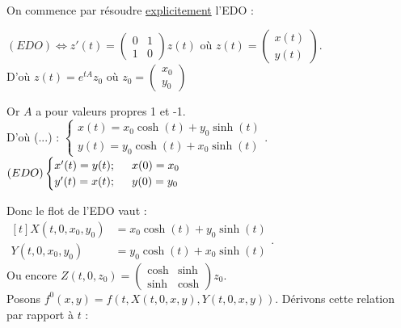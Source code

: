 \documentclass[12pt,a4paper]{article}
\begin{document}
		\begin{sol}$ $
			
			\begin{minipage}{18cm}
				On commence par résoudre \underline{explicitement} l'EDO :
				
				$(EDO) \iff z'(t) = \left(\begin{matrix}
					0 & 1\\
					1 & 0
				\end{matrix}\right)z(t)$ où $z(t) = \left(\begin{matrix}
				x(t)\\ y(t)
				\end{matrix}\right)$.\\
				
				D'où $z(t) = e^{tA}z_0$ où $z_0 = \left(\begin{matrix}
					x_0\\ y_0
				\end{matrix}\right)$
				
				Or $A$ a pour valeurs propres 1 et -1.\\
				D'où (...) : $\begin{cases}
					x(t) = x_0 \cosh(t) + y_0\sinh(t) \\
					y(t) = y_0 \cosh(t) + x_0\sinh(t)
				\end{cases}$.\\
				
				$(EDO) \begin{cases}
					x'(t) = y(t); \hspace{.5cm} x(0) = x_0\\
					y'(t) = x(t); \hspace{.5cm} y(0) = y_0
				\end{cases}$
			\end{minipage}
			\begin{minipage}{18.5cm}
				Donc le flot de l'EDO vaut : $\begin{aligned}[t]
				X(t,0,x_0,y_0) & = x_0\cosh(t) + y_0\sinh(t)\\
				Y(t,0,x_0,y_0) &= y_0\cosh(t) + x_0\sinh(t)
				\end{aligned}$.\\
				Ou encore $Z(t,0,z_0) = \left(\begin{matrix}
					\cosh & \sinh \\
					\sinh & \cosh
				\end{matrix}\right)z_0$.\\
				
				Posons $f^0(x,y) = f(t,X(t,0,x,y),Y(t,0,x,y))$. Dérivons cette relation par rapport à $t$ :\\
				

\end{minipage}
\end{sol}
\end{document}
